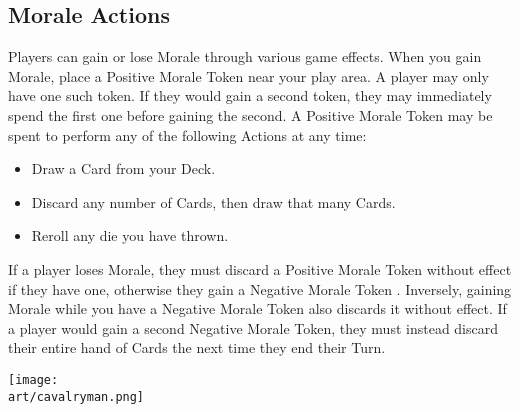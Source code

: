 \begin{multicols*}{2}
\subsection*{Morale Actions}
Players can gain or lose Morale through various game effects.
When you gain Morale, place a Positive Morale Token  near your play area.
A player may only have one such token.
If they would gain a second token, they may immediately spend the first one before gaining the second.
A Positive Morale Token may be spent to perform any of the following Actions at any time:
\begin{itemize}
  \item Draw a Card from your Deck.
  \item Discard any number of Cards, then draw that many Cards.
  \item Reroll any die you have thrown.
\end{itemize}

If a player loses Morale, they must discard a Positive Morale Token  without effect if they have one, otherwise they gain a Negative Morale Token .
Inversely, gaining Morale while you have a Negative Morale Token also discards it without effect.
If a player would gain a second Negative Morale Token, they must instead discard their entire hand of Cards the next time they end their Turn.\par


\vspace*{\fill}
\begin{center}
  \texttt{[image: \\art/cavalryman.png]}
\end{center}

\end{multicols*}
